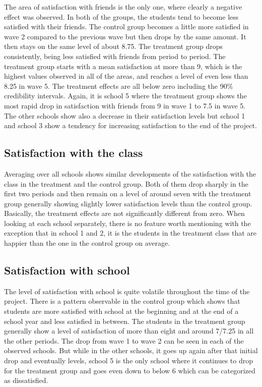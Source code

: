 \documentclass[a4, 12pt]{article}
\begin{document}
The area of satisfaction with friends is the only one, where clearly a negative effect was observed. In both of the groups, the students tend to become less satisfied with their friends. The control group becomes a little more satisfied in wave 2 compared to the previous wave but then drops by the same amount. It then stays on the same level of about 8.75. The treatment group drops consistently, being less satisfied with friends from period to period. The treatment group starts with a mean satisfaction at more than 9, which is the highest values observed in all of the areas, and reaches a level of even less than 8.25 in wave 5. The treatment effects are all below zero including the 90\% credibility intervals. Again, it is school 5 where the treatment group shows the most rapid drop in satisfaction with friends from 9 in wave 1 to 7.5 in wave 5. The other schools show also a decrease in their satisfaction levels but school 1 and school 3 show a tendency for increasing satisfaction to the end of the project.

\hypertarget{satisfaction-with-the-class}{%
\subsection{Satisfaction with the class}\label{satisfaction-with-the-class}}

Averaging over all schools shows similar developments of the satisfaction with the class in the treatment and the control group. Both of them drop sharply in the first two periods and then remain on a level of around seven with the treatment group generally showing slightly lower satisfaction levels than the control group. Basically, the treatment effects are not significantly different from zero.
When looking at each school separately, there is no feature worth mentioning with the exception that in school 1 and 2, it is the students in the treatment class that are happier than the one in the control group on average.

\hypertarget{satisfaction-with-school}{%
\subsection{Satisfaction with school}\label{satisfaction-with-school}}

The level of satisfaction with school is quite volatile throughout the time of the project. There is a pattern observable in the control group which shows that students are more satisfied with school at the beginning and at the end of a school year and less satisfied in between. The students in the treatment group generally show a level of satisfaction of more than eight and around 7/7.25 in all the other periods. The drop from wave 1 to wave 2 can be seen in each of the observed schools. But while in the other schools, it goes up again after that initial drop and eventually levels, school 5 is the only school where it continues to drop for the treatment group and goes even down to below 6 which can be categorized as dissatisfied.
\end{document}
